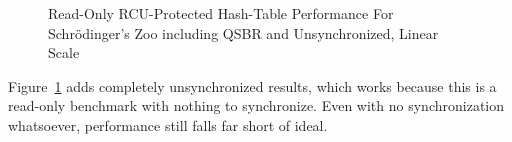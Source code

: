 \begin{figure}[tb]
\centering
{}
\caption{Read-Only RCU-Protected Hash-Table Performance For Schr\"odinger's Zoo including QSBR and Unsynchronized, Linear Scale}
\label{fig:datastruct:Read-Only RCU-Protected Hash-Table Performance For Schroedinger's Zoo including QSBR and Unsynchronized, Linear Scale}
\end{figure}

Figure~\ref{fig:datastruct:Read-Only RCU-Protected Hash-Table Performance For Schroedinger's Zoo including QSBR and Unsynchronized, Linear Scale}
adds completely unsynchronized results, which works because this
is a read-only benchmark with nothing to synchronize.
Even with no synchronization whatsoever, performance still falls far
short of ideal.

